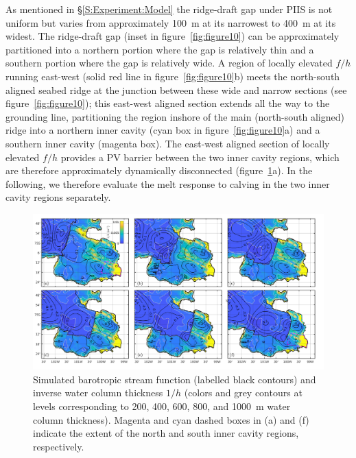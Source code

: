 \documentclass[draft]{agujournal2019}
\begin{document}
As mentioned in \S\ref{S:Experiment:Model} the ridge-draft gap under PIIS is not uniform but varies from approximately 100~m at its narrowest to 400~m at its widest.  The ridge-draft gap (inset in figure~\ref{fig:figure10}) can be approximately partitioned into a northern portion where the gap is relatively thin and a southern portion where the gap is relatively wide. A region of locally elevated $f/h$ running east-west (solid red line in figure~\ref{fig:figure10}b) meets the north-south aligned seabed ridge at the junction between these wide and narrow sections (see figure~\ref{fig:figure10}); this east-west aligned section extends all the way to the grounding line, partitioning the region inshore of the main (north-south aligned) ridge into a northern inner cavity (cyan box in figure~\ref{fig:figure10}a) and a southern inner cavity (magenta box). The east-west aligned section of locally elevated $f/h$  provides a PV barrier between the two inner cavity regions, which are therefore approximately dynamically disconnected (figure~\ref{fig:figure11}a). In the following, we therefore evaluate the melt response to calving in the two inner cavity regions separately.

\begin{figure}
    \centering
    \includegraphics[width = \textwidth]{../make_figures/plots/figure11.pdf}
    \caption{Simulated barotropic stream function (labelled black contours) and inverse water column thickness $1/h$ (colors and grey contours at levels corresponding to 200, 400, 600, 800, and 1000~m water column thickness). Magenta and cyan dashed boxes in (a) and (f) indicate the extent of the north and south inner cavity regions, respectively.} 
    \label{fig:figure11}
\end{figure}
\end{document}
